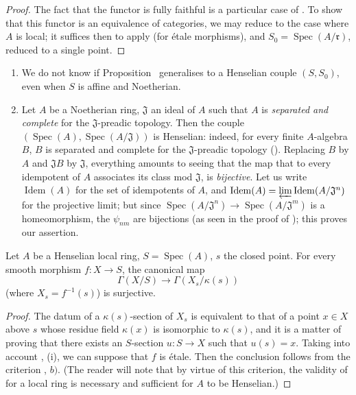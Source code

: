 \begin{proof}
The fact that the functor is fully faithful is a particular case of .
To show that this functor is an equivalence of categories, we may reduce to the case where $A$ is local;
it suffices then to apply  (for \'etale morphisms), and $S_0=\operatorname{Spec}(A/\mathfrak{r})$, reduced to a single point.
\end{proof}

\begin{remarks}[18.5.16]
\label{IV.18.5.16}
\begin{enumerate}
  \item[(i)] We do not know if Proposition~ generalises to a Henselian couple $(S,S_0)$, even when $S$ is affine and Noetherian.
  \item[(ii)] Let $A$ be a Noetherian ring, $\mathfrak{J}$ an ideal of $A$ such that $A$ is \emph{separated and complete} for the $\mathfrak{J}$-preadic topology.
Then the couple $(\operatorname{Spec}(A),\operatorname{Spec}(A/\mathfrak{J}))$ is Henselian:
indeed, for every finite $A$-algebra $B$, $B$ is separated and complete for the $\mathfrak{J}$-preadic topology ().
Replacing $B$ by $A$ and $\mathfrak{J}B$ by $\mathfrak{J}$, everything amounts to seeing that the map that to every idempotent of $A$ associates its class mod $\mathfrak{J}$, is \emph{bijective}.
Let us write $\operatorname{Idem}(A)$ for the set of idempotents of $A$, and $\operatorname{Idem}(A)=\varprojlim\operatorname{Idem}(A/\mathfrak{J}^n)$ for the projective limit;
but since $\operatorname{Spec}(A/\mathfrak{J}^n)\to\operatorname{Spec}(A/\mathfrak{J}^m)$ is a homeomorphism, the $\psi_{nm}$ are bijections (as seen in the proof of );
this proves our assertion.
\end{enumerate}
\end{remarks}

\begin{theorem}[18.5.17]
\label{IV.18.5.17}
Let $A$ be a Henselian local ring, $S=\operatorname{Spec}(A)$, $s$ the closed point.
For every smooth morphism $f:X\to S$, the canonical map
\[
\Gamma(X/S)\to\Gamma(X_s/\kappa(s))
\]
(where $X_s=f^{-1}(s)$) is surjective.
\end{theorem}

\begin{proof}
The datum of a $\kappa(s)$-section of $X_s$ is equivalent to that of a point $x\in X$ above $s$ whose residue field $\kappa(x)$ is isomorphic to $\kappa(s)$, and it is a matter of proving that there exists an $S$-section $u:S\to X$ such that $u(s)=x$.
Taking into account , (i), we can suppose that $f$ is \'etale.
Then the conclusion follows from the criterion , $b)$.
(The reader will note that by virtue of this criterion, the validity of  for a local ring is necessary and sufficient for $A$ to be Henselian.)
\end{proof}

